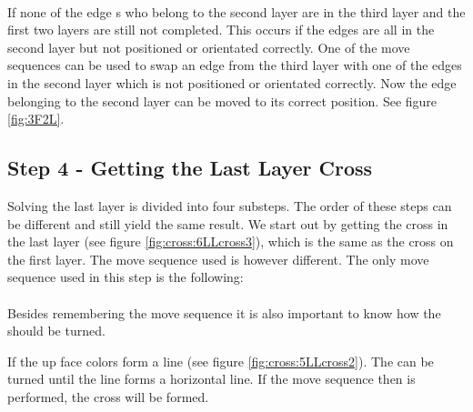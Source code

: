  \\


If none of the edge \cpiece{}s who belong to the second layer are in the third layer and the first two layers are still not completed. 
This occurs if the edges are all in the second layer but not positioned or orientated correctly. 
One of the move sequences can be used to swap an edge \cpiece{} from the third layer with one of the edges in the second layer which is not positioned or orientated correctly.
Now the edge \cpiece{} belonging to the second layer can be moved to its correct position. See figure \ref{fig:3F2L}.





\subsection{Step 4 - Getting the Last Layer Cross}\label{sub:step4}
Solving the last layer is divided into four substeps. The order of these steps can be different and still yield the same result. We start out by getting the cross in the last layer (see figure \ref{fig:cross:6LLcross3}), which is the same as the cross on the first layer. The move sequence used is however different. The only move sequence used in this step is the following: \\

 \\

Besides remembering the move sequence it is also important to know how the \cube{} should be turned.

If the up face colors form a line (see figure \ref{fig:cross:5LLcross2}). The \cube{} can be turned until the line forms a horizontal line. If the move sequence then is performed, the cross will be formed.

